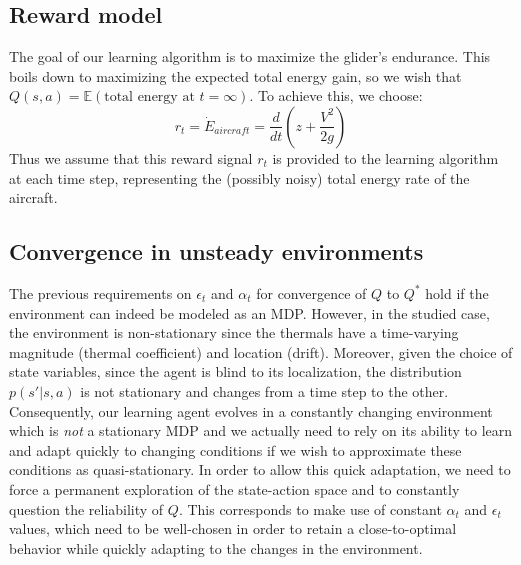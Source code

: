 \documentclass{jfpda}
\begin{document}
\subsection{Reward model}

The goal of our learning algorithm is to maximize the glider's endurance. This boils down to maximizing the expected total energy gain, so we wish that $Q(s,a)=\mathbb{E}\left(\textrm{total energy at }t=\infty\right)$. To achieve this, we choose:
\begin{equation}
r_{t} = \dot{E}_{aircraft} = \frac{d}{dt} \left( z + \frac{V^2}{2g}\right)
\end{equation}
Thus we assume that this reward signal $r_t$ is provided to the learning algorithm at each time step, representing the (possibly noisy) total energy rate of the aircraft.

\subsection{Convergence in unsteady environments}

The previous requirements on $\epsilon_t$ and $\alpha_t$ for convergence of $Q$ to $Q^*$ hold if the environment can indeed be modeled as an MDP.
However, in the studied case, the environment is non-stationary since the thermals have a time-varying magnitude (thermal coefficient) and location (drift). Moreover, given the choice of state variables, since the agent is blind to its localization, the distribution $p(s'|s,a)$ is not stationary and changes from a time step to the other.
Consequently, our learning agent evolves in a constantly changing environment which is \emph{not} a stationary MDP and we actually need to rely on its ability to learn and adapt quickly to changing conditions if we wish to approximate these conditions as quasi-stationary. In order to allow this quick adaptation, we need to force a permanent exploration of the state-action space and to constantly question the reliability of $Q$. This corresponds to make use of constant $\alpha_t$ and $\epsilon_t$ values, which need to be well-chosen in order to retain a close-to-optimal behavior while quickly adapting to the changes in the environment.
\end{document}

